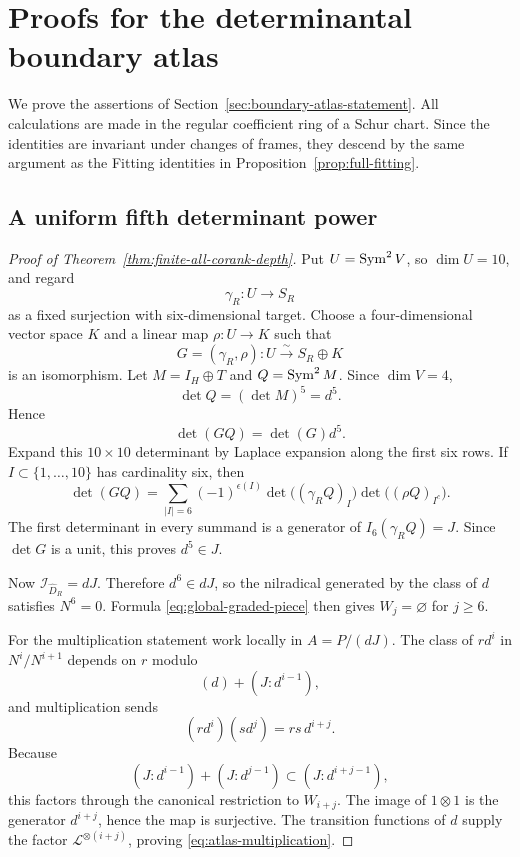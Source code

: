 \section{Proofs for the determinantal boundary atlas}
\label{sec:boundary-atlas-proofs}

We prove the assertions of
Section~\ref{sec:boundary-atlas-statement}.  All calculations are made
in the regular coefficient ring of a Schur chart.  Since the
identities are invariant under changes of frames, they descend by the
same argument as the Fitting identities in
Proposition~\ref{prop:full-fitting}.

\subsection{A uniform fifth determinant power}

\begin{proof}[Proof of Theorem~\ref{thm:finite-all-corank-depth}]
Put \(U=\operatorname{Sym}^2V\), so \(\dim U=10\), and regard
\[
 \gamma_R:U\longrightarrow S_R
\]
as a fixed surjection with six-dimensional target.  Choose a
four-dimensional vector space \(K\) and a linear map
\(\rho:U\to K\) such that
\[
 G=(\gamma_R,\rho):U\xrightarrow{\sim}S_R\oplus K
\]
is an isomorphism.  Let \(M=I_H\oplus T\) and
\(Q=\operatorname{Sym}^2M\).  Since \(\dim V=4\),
\begin{equation}\label{eq:det-sym2}
 \det Q=(\det M)^5=d^5.
\end{equation}
Hence
\[
 \det(GQ)=\det(G)d^5.
\]
Expand this \(10\times10\) determinant by Laplace expansion along the
first six rows.  If \(I\subset\{1,\ldots,10\}\) has cardinality six,
then
\[
 \det(GQ)
 =
 \sum_{|I|=6}
 (-1)^{\epsilon(I)}
 \det\bigl((\gamma_RQ)_I\bigr)
 \det\bigl((\rho Q)_{I^c}\bigr).
\]
The first determinant in every summand is a generator of
\(I_6(\gamma_RQ)=J\).  Since \(\det G\) is a unit, this proves
\(d^5\in J\).

Now \(\mathcal I_{\widehat D_R}=dJ\).  Therefore
\(d^6\in dJ\), so the nilradical generated by the class of \(d\)
satisfies \(N^6=0\).  Formula
\eqref{eq:global-graded-piece} then gives \(W_j=\varnothing\) for
\(j\ge6\).

For the multiplication statement work locally in
\(A=P/(dJ)\).  The class of \(rd^i\) in
\(N^i/N^{i+1}\) depends on \(r\) modulo
\[
 (d)+(J:d^{i-1}),
\]
and multiplication sends
\[
 (rd^i)(sd^j)=rs\,d^{i+j}.
\]
Because
\[
 (J:d^{i-1})+(J:d^{j-1})
 \subset (J:d^{i+j-1}),
\]
this factors through the canonical restriction to \(W_{i+j}\).
The image of \(1\otimes1\) is the generator \(d^{i+j}\), hence the
map is surjective.  The transition functions of \(d\) supply the
factor \(\mathcal L^{\otimes(i+j)}\), proving
\eqref{eq:atlas-multiplication}.
\end{proof}

